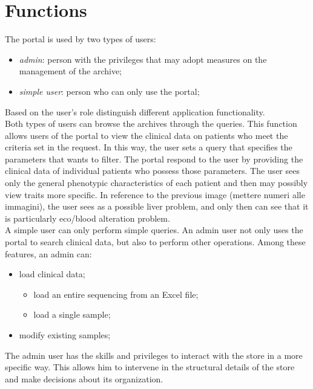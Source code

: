 \documentclass[a4paper]{report}
\begin{document}
\section{Functions}
The portal is used by two types of users:
\begin{itemize}
   \item \textit{admin}: person with the privileges that may adopt measures on the management of the archive;
   \item \textit{simple user}: person who can only use the portal;
\end{itemize}
Based on the user's role distinguish different application functionality. \\
Both types of users can browse the archives through the queries. This function allows users of the portal to view the clinical data on patients who meet the criteria set in the request. In this way, the user sets a query that specifies the parameters that wants to filter. The portal respond to the user by providing the clinical data of individual patients who possess those parameters. The user sees only the general phenotypic characteristics of each patient and then may possibly view traits more specific. In reference to the previous image (mettere numeri alle immagini), the user sees as a possible liver problem, and only then can see that it is particularly eco/blood alteration problem.\\
A simple user can only perform simple queries. An admin user not only uses the portal to search clinical data, but also to perform other operations. Among these features, an admin can:
\begin{itemize}
   \item load clinical data;
	\begin{itemize}
      		\item load an entire sequencing from an Excel file;
		\item load a single sample;
	\end{itemize}
   \item modify existing samples;
\end{itemize}
The admin user has the skills and privileges to interact with the store in a more specific way. This allows him to intervene in the structural details of the store and make decisions about its organization.
\end{document}
